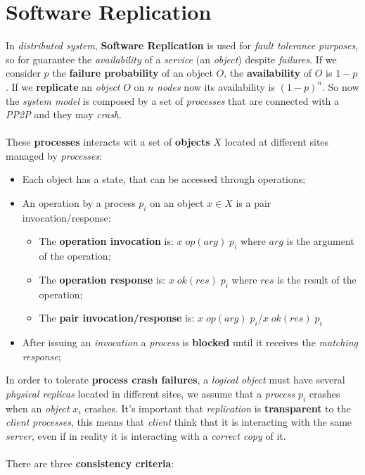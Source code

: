 \documentclass{article}
\begin{document}
\section{Software Replication}
In \emph{distributed system}, \textbf{Software Replication} is used for \emph{fault tolerance purposes}, so for guarantee the \emph{availability} of a \emph{service} (an \emph{object}) despite \emph{failures}. If we consider $p$ the \textbf{failure probability} of an object $O$, the \textbf{availability} of $O$ is $1-p$. If we \textbf{replicate} an \emph{object} $O$ on $n$ \emph{nodes} now its availability is $(1-p)^n$. So now the \emph{system model} is composed by a set of \emph{processes} that are connected with a\emph{ PP2P }and they may \emph{crash}. \\\\
These \textbf{processes} interacts wit a set of \textbf{objects} $X$ located at different sites managed by \emph{processes}:
\begin{itemize}
\item Each object has a state, that can be accessed through operations;
\item An operation by a process $p_i$ on an object $x \in X$ is a pair invocation/response:
\begin{itemize}
\item The \textbf{operation invocation} is: $x\; op(arg)\; p_i$ where $arg$ is the argument of the operation;
\item The \textbf{operation response} is: $x\; ok(res)\; p_i$ where $res$ is the result of the operation;
\item The \textbf{pair invocation/response} is:  $x\; op(arg)\; p_i/x\; ok(res)\; p_i$
\end{itemize}
\item After issuing an \emph{invocation} a \emph{process} is \textbf{blocked} until it receives the \emph{matching response};
\end{itemize}
In order to tolerate \textbf{process crash failures}, a \emph{logical object} must have several \emph{physical replicas} located in different sites, we assume that a \emph{process} $p_i$ crashes when an \emph{object} $x_i$ crashes. It's important that \emph{replication} is \textbf{transparent} to the \emph{client processes}, this means that \emph{client} think that it is interacting with the same \emph{server}, even if in reality it is interacting with a \emph{correct copy} of it. \\\\
There are three \textbf{consistency criteria}:
\end{document}

